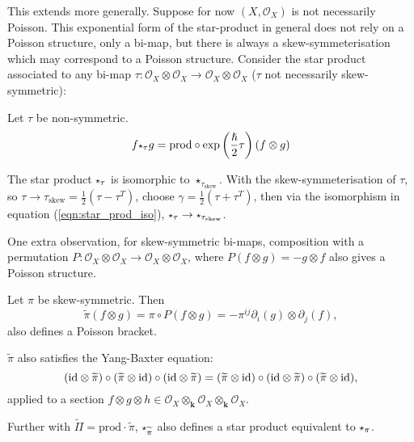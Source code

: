    
    This extends more generally. Suppose for now \( (X, \mathcal{O}_X )\) is not necessarily Poisson. This exponential form of the star-product in general does not rely on a Poisson structure, only a bi-map, but there is always a skew-symmeterisation which may correspond to a Poisson structure. Consider the star product associated to any bi-map \( \tau : \mathcal{O}_X \otimes \mathcal{O}_X \rightarrow \mathcal{O}_X \otimes \mathcal{O}_X\) (\( \tau\) not necessarily skew-symmetric):
    \begin{defn} Let \( \tau\) be non-symmetric.
    \[  f \starp_{\tau} g = \mathrm{prod} \circ \exp \left( \frac{\hslash}{2} \tau \right) ( f \otimes g) \]
   \end{defn} 
    The star product \( \starp_\tau \) is isomorphic to \( \star_{\tau_{\text{skew}}}\). With the skew-symmeterisation of \( \tau\), so \( \tau \rightarrow \tau_{\text{skew}} =\frac{1}{2} \left( \tau -  \tau^T \right) \), choose \( \gamma = \frac{1}{2}\left( \tau + \tau^T\right) \), then via the isomorphism in equation (\ref{eqn:star_prod_iso}),  \( \starp_{\tau} \rightarrow \starp_{\tau_{\text{skew}}}\).

    One extra observation, for skew-symmetric bi-maps, composition with a permutation \( P : \mathcal{O}_X \otimes \mathcal{O}_X \rightarrow \mathcal{O}_X \otimes \mathcal{O}_X \), where \(P(f \otimes g) = - g \otimes f\) also gives a Poisson structure.
    
    \begin{lem} Let \( \pi \) be skew-symmetric.
    Then \[  \widetilde{\pi} (f\otimes g)= \pi \circ P ( f \otimes g) = -\pi^{ij} \partial_i (g) \otimes \partial_j (f), \] also defines a Poisson bracket.
    
    \( \widetilde{\pi}\) also satisfies the Yang-Baxter equation:
    \[ (\mathrm{id} \otimes \widetilde{\pi}) \circ ( \widetilde{\pi} \otimes \mathrm{id}  ) \circ ( \mathrm{id} \otimes \widetilde{\pi}) =  ( \widetilde{\pi} \otimes \mathrm{id} ) \circ (\mathrm{id} \otimes \widetilde{\pi}) \circ  ( \widetilde{\pi} \otimes \mathrm{id} ), \] 
     applied to a section \( f \otimes g \otimes h  \in \mathcal{O}_X \otimes_{\mathbf{k}} \mathcal{O}_X \otimes_{\mathbf{k}} \mathcal{O}_X  \).
     
    Further with \( \widetilde{\Pi} = \mathrm{prod} \cdot \widetilde{\pi}\), \( \starp_{\widetilde{\pi}}\) also defines a star product equivalent to  \( \starp_{\pi}\).
    \end{lem}
    
